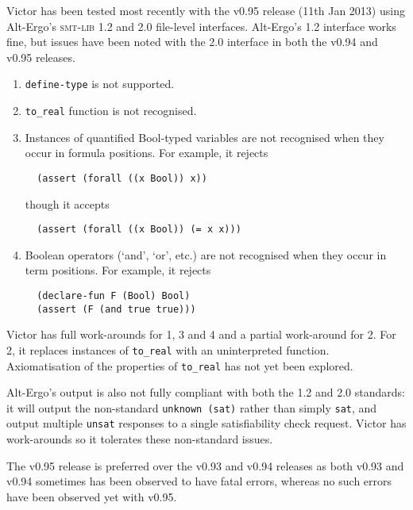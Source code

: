 \documentclass[12pt,fleqn]{article}
\newcommand{\smtlib}{\textsc{smt-lib}}
\begin{document}
Victor has been tested most recently with the v0.95 release (11th Jan
2013) using Alt-Ergo's \smtlib{} 1.2 and 2.0 file-level interfaces.
Alt-Ergo's 1.2 interface works fine, but issues have been noted with
the 2.0 interface in both the v0.94 and v0.95 releases.
\begin{enumerate}
\item \texttt{define-type} is not supported.
\item \texttt{to\_real} function is not recognised.
\item Instances of quantified Bool-typed variables are 
  not recognised when they occur in formula positions. 
  For example, it rejects
\begin{verbatim}
  (assert (forall ((x Bool)) x))
\end{verbatim}
  though it accepts
\begin{verbatim}
  (assert (forall ((x Bool)) (= x x)))
\end{verbatim}

\item Boolean operators (`and', `or', etc.) are not recognised when
  they occur in term positions. For example, it rejects
\begin{verbatim}
  (declare-fun F (Bool) Bool)
  (assert (F (and true true)))
\end{verbatim}
\end{enumerate}
Victor has full work-arounds for 1, 3 and 4 and a partial work-around
for 2.  For 2, it replaces instances of \texttt{to\_real} with an
uninterpreted function.  Axiomatisation of the properties of
\texttt{to\_real} has not yet been explored.

Alt-Ergo's output is also not fully compliant with both the 1.2 and
2.0 standards: it will output the non-standard \verb+unknown (sat)+
rather than simply \verb+sat+, and output multiple \texttt{unsat}
responses to a single satisfiability check request.  Victor has
work-arounds so it tolerates these non-standard issues.

The v0.95 release is preferred over the v0.93 and v0.94 releases as
both v0.93 and v0.94 sometimes has been observed to have fatal errors,
whereas no such errors have been observed yet with v0.95.

\end{document}

